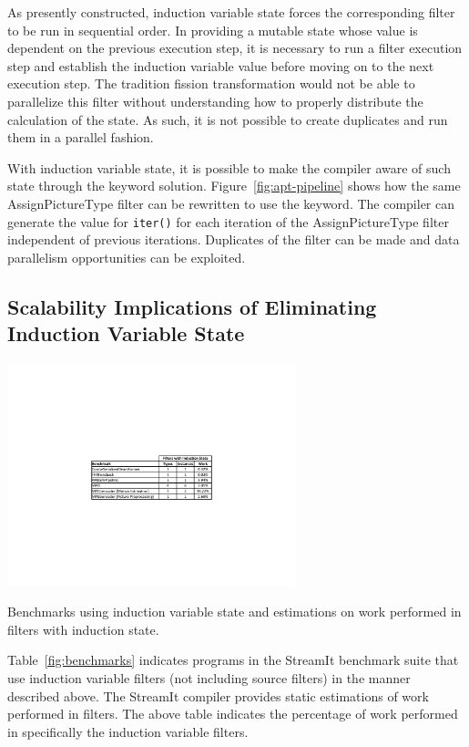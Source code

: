 As presently constructed, induction variable state for\-ces the
corresponding filter to be run in sequential order.  In providing a
mutable state whose value is dependent on the previous execution step,
it is necessary to run a filter execution step and establish the
induction variable value before moving on to the next execution step.
The tradition fission transformation would not be able to parallelize
this filter without understanding how to properly distribute the
calculation of the state.  As such, it is not possible 
to create duplicates and run them in a parallel fashion.  

With induction variable state, it is possible to make the 
compiler aware of such state through the keyword solution.  
Figure~\ref{fig:apt-pipeline} shows how the same AssignPictureType filter can be 
rewritten to use the keyword.  The compiler can generate the value
for {\tt iter()} for each iteration of the AssignPictureType filter independent
of previous iterations.  Duplicates of the filter can be made and
data parallelism opportunities can be exploited.

\vspace{-3pt}
\subsection{Scalability Implications of Eliminating Induction Variable State}
\label{sec:model-analysis}

\begin{table}[t]
\includegraphics[width=3.3in]{figures/induction-benchmarks.pdf}
\caption{Benchmarks using induction variable state and estimations on work performed in filters with induction state.\protect\label{fig:benchmarks}}
\end{table}


Table~\ref{fig:benchmarks} indicates programs in the StreamIt
benchmark suite that use induction variable filters (not including
source filters) in the manner described above.  The StreamIt compiler
provides static estimations of work performed in filters.  The above
table indicates the percentage of work performed in specifically the induction
variable filters.

